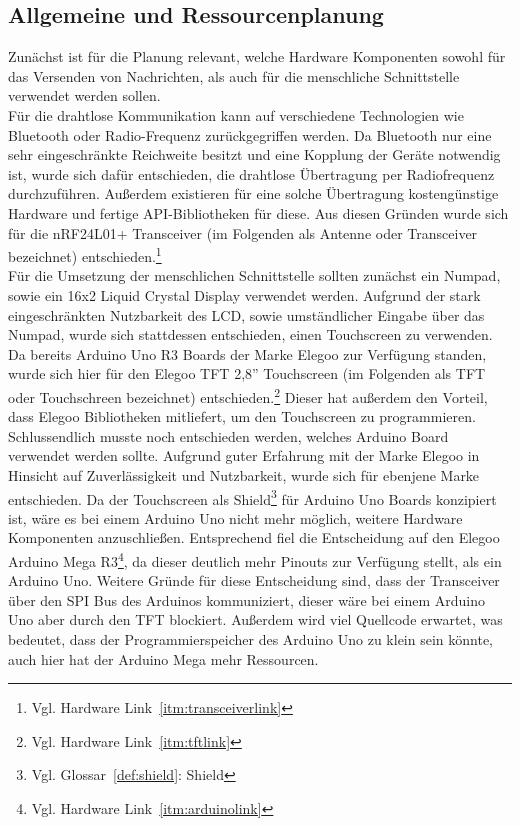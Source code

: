 \documentclass[a4paper, 11pt]{scrartcl}
\begin{document}
\subsection{Allgemeine und Ressourcenplanung}\label{ch:planning}
Zunächst ist für die Planung relevant, welche Hardware Komponenten sowohl für das Versenden von Nachrichten, als auch für die menschliche Schnittstelle verwendet werden sollen.
\\
Für die drahtlose Kommunikation kann auf verschiedene Technologien wie Bluetooth oder Radio-Frequenz zurückgegriffen werden. Da Bluetooth nur eine sehr eingeschränkte
Reichweite besitzt und eine Kopplung der Geräte notwendig ist, wurde sich dafür entschieden, die drahtlose Übertragung per Radiofrequenz durchzuführen. Außerdem existieren
für eine solche Übertragung kostengünstige Hardware und fertige API-Bibliotheken für diese. Aus diesen Gründen wurde sich für die nRF24L01+ Transceiver 
(im Folgenden als \glqq Antenne\grqq{} oder \glqq Transceiver\grqq{} bezeichnet) entschieden.\footnote{Vgl. Hardware Link~\ref{itm:transceiverlink}}
\\
Für die Umsetzung der menschlichen Schnittstelle sollten zunächst ein Numpad, sowie ein 16x2 Liquid Crystal Display verwendet werden. Aufgrund der stark eingeschränkten Nutzbarkeit des LCD,
sowie umständlicher Eingabe über das Numpad, wurde sich stattdessen entschieden, einen Touchscreen zu verwenden. Da bereits Arduino Uno R3 Boards der Marke Elegoo zur Verfügung standen,
wurde sich hier für den Elegoo TFT 2,8'' Touchscreen (im Folgenden als \glqq TFT\grqq{} oder \glqq Touchschreen\grqq{} bezeichnet) entschieden.\footnote{Vgl. Hardware Link~\ref{itm:tftlink}} Dieser
hat außerdem den Vorteil, dass Elegoo Bibliotheken mitliefert, um den Touchscreen zu programmieren.
\\
Schlussendlich musste noch entschieden werden, welches Arduino Board verwendet werden sollte. Aufgrund guter Erfahrung mit der Marke Elegoo in Hinsicht auf Zuverlässigkeit und Nutzbarkeit, wurde sich für
ebenjene Marke entschieden. Da der Touchscreen als Shield\footnote{Vgl. Glossar~\ref{def:shield}: Shield} für Arduino Uno Boards konzipiert ist, wäre es bei einem Arduino Uno nicht mehr möglich,
weitere Hardware Komponenten anzuschließen. Entsprechend fiel die Entscheidung auf den Elegoo Arduino Mega R3\footnote{Vgl. Hardware Link~\ref{itm:arduinolink}}, da dieser deutlich mehr Pinouts zur Verfügung
stellt, als ein Arduino Uno. Weitere Gründe für diese Entscheidung sind, dass der Transceiver über den SPI Bus des Arduinos kommuniziert, dieser wäre bei einem Arduino Uno aber durch den TFT blockiert. Außerdem
wird viel Quellcode erwartet, was bedeutet, dass der Programmierspeicher des Arduino Uno zu klein sein könnte, auch hier hat der Arduino Mega mehr Ressourcen.
\end{document}
